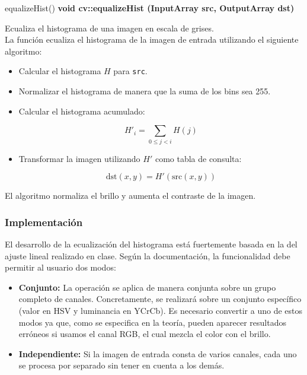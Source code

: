 \documentclass[11pt]{article}
\begin{document}
          \begin{mainbox}{\large equalizeHist()}
              \textbf{void cv::equalizeHist (InputArray src, OutputArray dst)}

              \vspace{2ex}

              Ecualiza el histograma de una imagen en escala de grises. \\ La función
              ecualiza el histograma de la imagen de entrada utilizando el siguiente
              algoritmo:

              \begin{itemize}
                  \item Calcular el histograma \(H\) para \texttt{src}.
                  \item Normalizar el histograma de manera que la suma de los bins sea 255.
                  \item Calcular el histograma acumulado:

                        \[ H'_i = \sum_{0 \le j < i} H(j) \]

                  \item Transformar la imagen utilizando \( H' \) como tabla de consulta:

                        \[ \text{dst}(x,y) = H'(\text{src}(x,y)) \]
              \end{itemize}

              El algoritmo normaliza el brillo y aumenta el contraste de la imagen.
          \end{mainbox}

          \clearpage

      \subsubsection{Implementación}

          \noindent
          El desarrollo de la ecualización del histograma está fuertemente basada en la del ajuste lineal
          realizado en clase. Según la documentación, la funcionalidad debe permitir al usuario dos modos:

          \begin{itemize}
              \item \textbf{Conjunto:} La operación se aplica de manera conjunta sobre un grupo completo de canales. Concretamente, se realizará sobre un conjunto específico (valor en HSV y luminancia en YCrCb). Es necesario convertir a uno de estos modos ya que, como se especifica en la teoría, pueden aparecer resultados erróneos si usamos el canal RGB, el cual mezcla el color con el brillo. \cite{wikipedia_hist_eq}

              \item \textbf{Independiente:} Si la imagen de entrada consta de varios canales, cada uno se procesa por separado sin tener en cuenta a los demás.
          \end{itemize}
\end{document}
